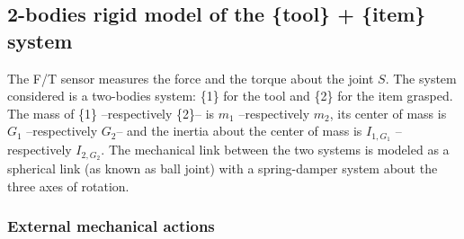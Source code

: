 \documentclass[a4paper, 11pt]{article}
\begin{document}
\newpage

\subsection{2-bodies rigid model of the \{tool\} + \{item\} system}


The F/T sensor measures the force and the torque about the joint $S$.
The system considered is a two-bodies system: \{1\} for the tool and \{2\} for the item grasped. The mass of \{1\} –respectively \{2\}– is $m_1$ –respectively $m_2$, its center of mass is $G_1$ –respectively $G_2$– and the inertia about the center of mass is $I_{1, G_1}$ –respectively $I_{2, G_2}$. The mechanical link between the two systems is modeled as a spherical link (as known as ball joint) with a spring-damper system about the three axes of rotation.

\subsubsection{External mechanical actions}
\end{document}
